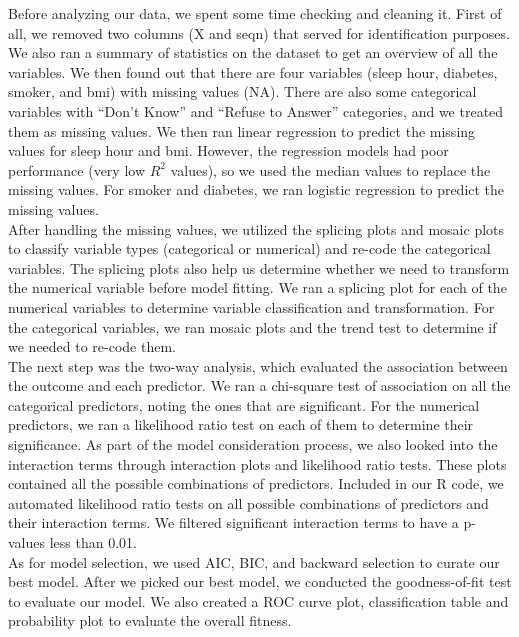 \documentclass[12pt]{article}
\begin{document}
Before analyzing our data, we spent some time checking and cleaning it. First of all, we removed two columns (X and seqn) that served for identification purposes. We also ran a summary of statistics on the dataset to get an overview of all the variables. We then found out that there are four variables (sleep hour, diabetes, smoker, and bmi) with missing values (NA). There are also some categorical variables with “Don’t Know” and “Refuse to Answer”  categories, and we treated them as missing values. We then ran linear regression to predict the missing values for sleep hour and bmi. However, the regression models had poor performance (very low $R^2$ values), so we used the median values to replace the missing values. For smoker and diabetes, we ran logistic regression to predict the missing values. \\

After handling the missing values, we utilized the splicing plots and mosaic plots to classify variable types (categorical or numerical) and re-code the categorical variables. The splicing plots also help us determine whether we need to transform the numerical variable before model fitting. We ran a splicing plot for each of the numerical variables to determine variable classification and transformation. For the categorical variables, we ran mosaic plots and the trend test to determine if we needed to re-code them.\\

The next step was the two-way analysis, which evaluated the association between the outcome and each predictor. We ran a chi-square test of association on all the categorical predictors, noting the ones that are significant. For the numerical predictors, we ran a likelihood ratio test on each of them to determine their significance. 
As part of the model consideration process, we also looked into the interaction terms through interaction plots and likelihood ratio tests. These plots contained all the possible combinations of predictors. Included in our R code, we automated likelihood ratio tests on all possible combinations of predictors and their interaction terms. We filtered significant interaction terms to have a p-values less than 0.01. \\

As for model selection, we used AIC, BIC, and backward selection to curate our best model. After we picked our best model, we conducted the goodness-of-fit test to evaluate our model. We also created a ROC curve plot, classification table and probability plot to evaluate the overall fitness.\\
\end{document}
